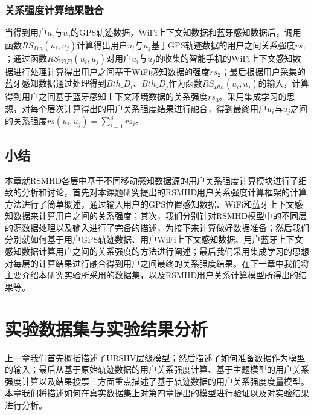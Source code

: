 \subsection{关系强度计算结果融合}
当得到用户$u_{i}$与$u_{j}$的GPS轨迹数据，WiFi上下文知数据和蓝牙感知数据后，调用函数$RS_{Tra}(u_{i},u_{j})$计算得出用户$u_{i}$与$u_{j}$基于GPS轨迹数据的用户之间关系强度$rs_{1}$；通过函数$RS_{WiFi}(u_{i},u_{j})$对用户$u_{i}$与$u_{j}$的收集的智能手机的WiFi上下文感知数据进行处理计算得出用户之间基于WiFi感知数据的强度$rs_{2}$；最后根据用户采集的蓝牙感知数据通过处理得到$Bth\_D_{i}$、$Bth\_D_{j}$作为函数$RS_{Bth}(u_{i},u_{j})$的输入，计算得到用户之间基于蓝牙感知上下文环境数据的关系强度$rs_{3}$。采用集成学习的思想，对每个层次计算得出的用户关系强度结果进行融合，得到最终用户$u_{i}$与$u_{j}$之间的关系强度$rs(u_{i},u_{j})=\sum_{i=1}^{3}rs_{i}$。

\section{小结}
\label{sec:section4-4}
本章就RSMHD各层中基于不同移动感知数据源的用户关系强度计算模块进行了细致的分析和讨论，首先对本课题研究提出的RSMHD用户关系强度计算框架的计算方法进行了简单概述，通过输入用户的GPS位置感知数据、WiFi和蓝牙上下文感知数据来计算用户之间的关系强度；其次，我们分别针对RSMHD模型中的不同层的源数据处理以及输入进行了完备的描述，为接下来计算做好数据准备；然后我们分别就如何基于用户GPS轨迹数据、用户WiFi上下文感知数据、用户蓝牙上下文感知数据计算用户之间的关系强度的方法进行阐述；最后我们采用集成学习的思想对每层的计算结果进行融合得到用户之间最终的关系强度结果。在下一章中我们将主要介绍本研究实验所采用的数据集，以及RSMHD用户关系计算模型所得出的结果等。

\chapter{实验数据集与实验结果分析}
\label{chap:chapter03}
上一章我们首先概括描述了URSHV层级模型；然后描述了如何准备数据作为模型的输入；最后从基于原始轨迹数据的用户关系强度计算、基于主题模型的用户关系强度计算以及结果投票三方面重点描述了基于轨迹数据的用户关系强度度量模型。本章我们将描述如何在真实数据集上对第四章提出的模型进行验证以及对实验结果进行分析。

